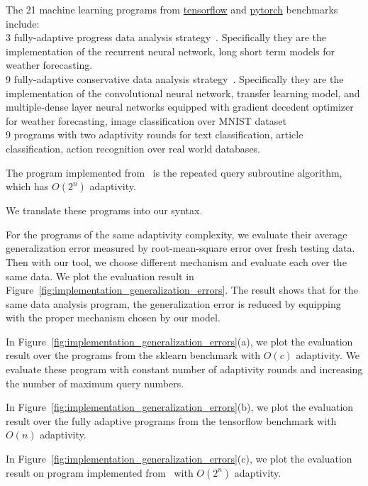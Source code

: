 The 21 machine learning programs
from \hyperlink{https://github.com/tensorflow/tensorflow/tree/master/tensorflow/examples}{tensorflow}
and \hyperlink{https://github.com/pytorch/pytorch}{pytorch}
benchmarks include:
\\
3 fully-adaptive progress data analysis
strategy~\cite{ZrnicH19}.
Specifically they are the implementation of the recurrent neural network, long short term models for 
weather forecasting.
\\
9
fully-adaptive conservative data analysis
strategy~\cite{ZrnicH19}.
Specifically they are the implementation of the convolutional neural network, transfer learning model,
and multiple-dense layer neural networks equipped with gradient decedent optimizer for
weather forecasting, image classification over MNIST dataset
\\
9 programs with two adaptivity rounds for text classification,
article classification, action recognition over real world databases.


The program implemented from~\cite{Jamieson2015TheAO} is the repeated query subroutine algorithm, which
has $O(2^n)$ adaptivity.

We translate these programs into our syntax.

For the programs of the same adaptivity complexity, we evaluate their average generalization error measured by root-mean-square error over fresh testing data.
Then with our tool, we choose different mechanism and evaluate each over the same data.
We plot the evaluation result in Figure~\ref{fig:implementation_generalization_errors}.
The result shows that for the same data analysis program, the generalization error is reduced
by equipping with the proper mechanism chosen by our model.

In Figure~\ref{fig:implementation_generalization_errors}(a), we plot the evaluation result over the
programs from the sklearn benchmark with $O(c)$ adaptivity.
We evaluate these program with constant number of adaptivity rounds and increasing the number of
maximum query numbers.

In Figure~\ref{fig:implementation_generalization_errors}(b), we plot the 
evaluation result over the fully adaptive
programs from the tensorflow benchmark with $O(n)$ adaptivity.

In Figure~\ref{fig:implementation_generalization_errors}(c), we plot the 
evaluation result on
program implemented from~\cite{Jamieson2015TheAO} with $O(2^n)$ adaptivity.




